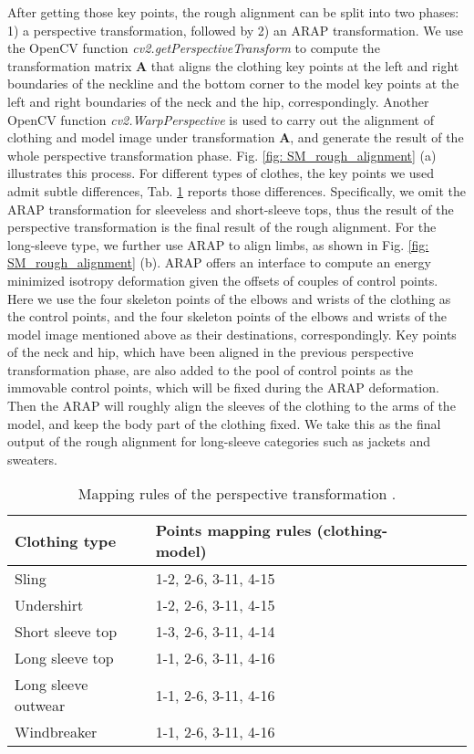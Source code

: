 \documentclass[10pt,twocolumn,letterpaper]{article}
\begin{document}
After getting those key points, the rough alignment can be split into two phases: 1) a perspective transformation, followed by 2) an ARAP transformation. We use the OpenCV function \textit{cv2.getPerspectiveTransform} to compute the transformation matrix $\bm{A}$ that aligns the clothing key points at the left and right boundaries of the neckline and the bottom corner to the model key points at the left and right boundaries of the neck and the hip, correspondingly. Another OpenCV function \textit{cv2.WarpPerspective} is used to carry out the alignment of clothing and model image under transformation $\bm{A}$, and generate the result of the whole perspective transformation phase.
Fig. \ref{fig: SM_rough_alignment} (a) illustrates this process. For different types of clothes, the key points we used admit subtle differences, Tab. \ref{tab:mapping_rule} reports those differences. Specifically, we omit the ARAP transformation for sleeveless and short-sleeve tops, thus the result of the perspective transformation is the final result of the rough alignment. For the long-sleeve type, we further use ARAP to align limbs, as shown in Fig. \ref{fig: SM_rough_alignment} (b). ARAP offers an interface to compute an energy minimized isotropy deformation given the offsets of couples of control points. Here we use the four skeleton points of the elbows and wrists of the clothing as the control points, and the four skeleton points of the elbows and wrists of the model image mentioned above as their destinations, correspondingly. Key points of the neck and hip, which have been aligned in the previous perspective transformation phase, are also added to the pool of control points as the immovable control points, which will be fixed during the ARAP deformation. Then the ARAP will roughly align the sleeves of the clothing to the arms of the model, and keep the body part of the clothing fixed. We take this as the final output of the rough alignment for long-sleeve categories such as jackets and sweaters.


\begin{table}[h]
    \caption{Mapping rules of the perspective transformation .}
    \label{tab:mapping_rule}
    \centering
    \begin{tabular}{llll}
        \toprule
        Clothing type & Points mapping rules (clothing-model) \\ 
         \midrule
        Sling & 1-2, 2-6, 3-11, 4-15  \\ 
        Undershirt & 1-2, 2-6, 3-11, 4-15  \\ 
        Short sleeve top & 1-3, 2-6, 3-11, 4-14  \\ 
        Long sleeve top & 1-1, 2-6, 3-11, 4-16  \\ 
        Long sleeve outwear & 1-1, 2-6, 3-11, 4-16  \\
        Windbreaker & 1-1, 2-6, 3-11, 4-16  \\ 
        \bottomrule
    \end{tabular}
\end{table}
\end{document}
